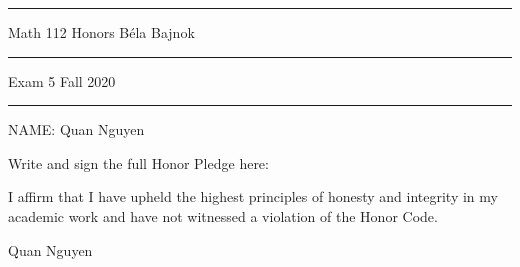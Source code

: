 \documentclass[12pt]{article}
\begin{document}
\hrule
\vspace{.2cm}

{\Large \noindent Math 112 Honors
\hfill
B\'ela Bajnok}

\vspace{.3cm}
\hrule

{\Large \noindent 
Exam 5
\hfill
Fall 2020}

\vspace{.3cm}
\hrule



\noindent NAME:  Quan Nguyen


\noindent \hrulefill\rule{0pt}{4pt}

\noindent Write and sign the full Honor Pledge here:

\vspace{2mm}

I affirm that I have upheld the highest principles of honesty and integrity in my academic work and have not witnessed a violation of the Honor Code. \par

Quan Nguyen

\vspace{8mm}

\noindent \hrulefill\rule{0pt}{4pt}

\end{document}
